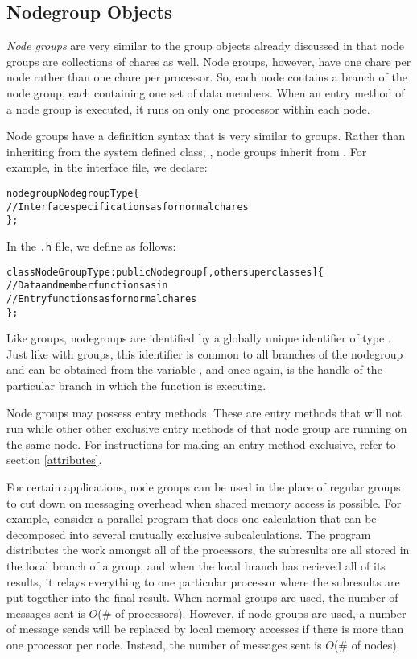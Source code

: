 \subsection{Nodegroup Objects}

{\it Node groups}\experimental{}   are very
similar to the group objects already discussed in that node groups are
collections of chares as well.  Node groups, however, have one chare per node
rather than one chare per processor.  So, each node contains a branch of the
node group, each containing one set of data members.  When an entry method of a
node group is executed, it runs on only one processor within each node.

Node groups have a definition syntax that is very similar to groups.  Rather
than inheriting from the system defined class, , node groups inherit
from .  For example, in the interface file, we declare:

\begin{alltt}
 nodegroup NodegroupType \{
  // Interface specifications as for normal chares
 \};
\end{alltt}

In the {\tt .h} file, we define  as follows:

\begin{alltt}
 class NodeGroupType : public Nodegroup [,other superclasses ] \{
  // Data and member functions as in \CC{}
  // Entry functions as for normal chares
 \};
\end{alltt}

Like groups, nodegroups are identified by a globally unique identifier of type
.  Just like with groups, this identifier is
common to all branches of the nodegroup and can be obtained from the variable
, and once again, 
 is the handle of the particular branch in which the function is
executing.

Node groups may possess  entry methods.  These
are entry methods that will not run while other other exclusive entry methods
of that node group are running on the same node.  For instructions for making
an entry method exclusive, refer to section \ref{attributes}.

For certain applications, node groups can be used in the place of regular
groups to cut down on messaging overhead when shared memory access is possible.
For example, consider a parallel program that does one calculation that can be
decomposed into several mutually exclusive subcalculations.  The program
distributes the work amongst all of the processors, the subresults are all
stored in the local branch of a group, and when the local branch has recieved
all of its results, it relays everything to one particular processor where the
subresults are put together into the final result.  When normal groups are
used, the number of messages sent is $O$(\# of processors).  However, if node
groups are used, a number of message sends will be replaced by local memory
accesses if there is more than one processor per node.  Instead, the number of
messages sent is $O$(\# of nodes).

